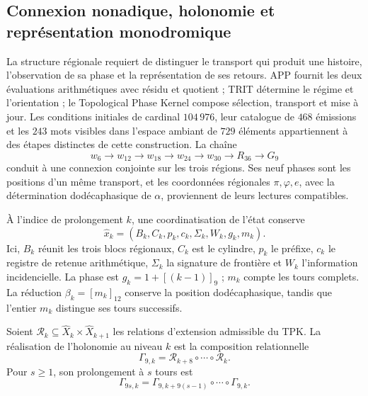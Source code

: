 \subsection{Connexion nonadique, holonomie et représentation monodromique}
\label{mono-ampl:conexion}

La structure régionale requiert de distinguer le transport qui produit une
histoire, l'observation de sa phase et la représentation de ses retours.
APP fournit les deux évaluations arithmétiques avec résidu et quotient ; TRIT
détermine le régime et l'orientation ; le Topological Phase Kernel compose
sélection, transport et mise à jour. Les conditions initiales de
cardinal \(104\,976\), leur catalogue de \(468\) émissions et les \(243\)
mots visibles dans l'espace ambiant de \(729\) éléments appartiennent à des étapes
distinctes de cette construction. La chaîne
\[
 w_6\longrightarrow w_{12}\longrightarrow w_{18}
 \longrightarrow w_{24}\longrightarrow w_{30}
 \longrightarrow R_{36}\longrightarrow G_9
\]
conduit à une connexion conjointe sur les trois régions. Ses neuf phases
sont les positions d’un même transport, et les coordonnées régionales
\(\pi,\varphi,e\), avec la détermination dodécaphasique de \(\alpha\),
proviennent de leurs lectures compatibles\cite{hmtintegral,hmtholonomia}.

À l'indice de prolongement \(k\), une coordinatisation de l'état conserve
\[
 \widehat x_k=(B_k,C_k,p_k,c_k,\Sigma_k,W_k,g_k,m_k).
\]
Ici, \(B_k\) réunit les trois blocs régionaux, \(C_k\) est le cylindre,
\(p_k\) le préfixe, \(c_k\) le registre de retenue arithmétique, \(\Sigma_k\) la signature
de frontière et \(W_k\) l'information incidencielle. La phase est
\(g_k=1+[(k-1)]_9\) ; \(m_k\) compte les tours complets. La réduction
\(\beta_k=[m_k]_{12}\) conserve la position dodécaphasique, tandis que
l'entier \(m_k\) distingue ses tours successifs.

\begin{definition}
\label{mono-ampl:def-vuelta}
Soient \(\mathcal R_k\subseteq\widehat X_k\times\widehat X_{k+1}\)
les relations d'extension admissible du TPK. La réalisation de
l'holonomie au niveau \(k\) est la composition relationnelle
\[
 \Gamma_{9,k}=\mathcal R_{k+8}\circ\cdots\circ\mathcal R_k.
\]
Pour \(s\geq1\), son prolongement à \(s\) tours est
\[
 \Gamma_{9s,k}=
 \Gamma_{9,k+9(s-1)}\circ\cdots\circ\Gamma_{9,k}.
\]
\end{definition}

